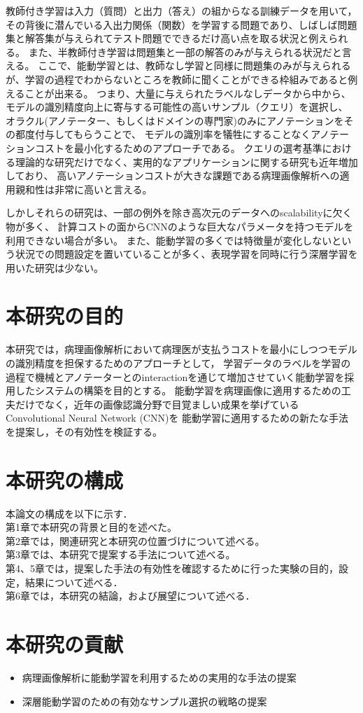 教師付き学習は入力（質問）と出力（答え）の組からなる訓練データを用いて， その背後に潜んでいる入出力関係（関数）を学習する問題であり、しばしば問題集と解答集が与えられてテスト問題でできるだけ高い点を取る状況と例えられる。
また、半教師付き学習は問題集と一部の解答のみが与えられる状況だと言える。
ここで、能動学習とは、教師なし学習と同様に問題集のみが与えられるが、学習の過程でわからないところを教師に聞くことができる枠組みであると例えることが出来る。
つまり、大量に与えられたラベルなしデータから中から、モデルの識別精度向上に寄与する可能性の高いサンプル（クエリ）を選択し、
オラクル(アノテーター、もしくはドメインの専門家)のみにアノテーションをその都度付与してもらうことで、
モデルの識別率を犠牲にすることなくアノテーションコストを最小化するためのアプローチである。
クエリの選考基準における理論的な研究だけでなく、実用的なアプリケーションに関する研究も近年増加しており、
高いアノテーションコストが大きな課題である病理画像解析への適用親和性は非常に高いと言える。

しかしそれらの研究は、一部の例外を除き高次元のデータへのscalabilityに欠く物が多く、
計算コストの面からCNNのような巨大なパラメータを持つモデルを利用できない場合が多い。
また、能動学習の多くでは特徴量が変化しないという状況での問題設定を置いていることが多く、表現学習を同時に行う深層学習を用いた研究は少ない。

\section{本研究の目的}
本研究では，病理画像解析において病理医が支払うコストを最小にしつつモデルの識別精度を担保するためのアプローチとして，
学習データのラベルを学習の過程で機械とアノテーターとのinteractionを通じて増加させていく能動学習を採用したシステムの構築を目的とする。
能動学習を病理画像に適用するための工夫だけでなく，近年の画像認識分野で目覚ましい成果を挙げているConvolutional Neural Network (CNN)を
能動学習に適用するための新たな手法を提案し，その有効性を検証する。


\section{本研究の構成}
本論文の構成を以下に示す．\\
第1章で本研究の背景と目的を述べた。 \\
第2章では，関連研究と本研究の位置づけについて述べる。\\
第3章では、本研究で提案する手法について述べる。\\
第4、5章では，提案した手法の有効性を確認するために行った実験の目的，設定，結果について述べる．\\
第6章では，本研究の結論，および展望について述べる．

\section{本研究の貢献}
\begin{itemize}
    \item 病理画像解析に能動学習を利用するための実用的な手法の提案
    \item 深層能動学習のための有効なサンプル選択の戦略の提案
\end{itemize}
